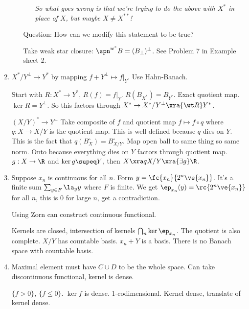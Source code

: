 \begin{enumerate}
\begin{enumerate}
\begin{enumerate}
{\it So what goes wrong is that we're trying to do the above with $X^*$ in place of $X$, but maybe $X\ne X^{**}$!}

\end{enumerate}
Question: How can we modify this statement to be true?

Take weak star closure: $\spn^{w^*} B=(B_{\perp})^{\perp}$. See Problem 7 in Example sheet 2.
\end{enumerate}

\item
$X^*/Y^{\perp}\to Y^*$ by mapping $f+Y^{\perp}\mapsto f|_Y$. Use Hahn-Banach.

Start with $R:X^*\to Y^*$, $R(f)=f|_Y$. $R(B_{X^*})=B_{Y^*}$. 
Exact quotient map.
$\ker R=Y^{\perp}$. So this factors through 
$X^*\to X^*/Y^{\perp}\xra{\wt R} Y^*$. 

$(X/Y)^*\to Y^{\perp}$ Take composite of $f$ and quotient map $f\mapsto f\circ q$ where $q:X\to X/Y$ is the quotient map. This is well defined because $q$ dies on $Y$. This is the fact that $q(B_X^{\circ})=B_{X/Y}^{\circ}$. Map open ball to same thing so same norm. Onto because everything dies on $Y$ factors through quotient map. $g:X\to \R$ and $\ker g\supeq Y$, then $X\xra q X/Y\xra{\exists g}\R$.
\item 
Suppose $x_n$ is continuous for all $n$. Form $y=\fc{x_n}{2^n\ve{x_n}}$. It's a finite sum $\sum_{y\in F}\la_yy$ where $F$ is finite. We get $\ep_{x_n}(y)=\rc{2^n\ve{x_n}}$ for all $n$, this is 0 for large $n$, get a contradiction.

Using Zorn can construct continuous functional.

Kernels are closed, intersection of kernels $\bigcap_n \ker \ep_{x_n}$. The quotient is also complete. $X/Y$ has countable basis. $x_n+Y$ is a basis. There is no Banach space with countable basis.
\item
Maximal element must have $C\cup D$ to be the whole space. Can take discontinuous functional, kernel is dense.

$\{f>0\}$, $\{f\le 0\}$. $\ker f$ is dense. 1-codimensional. Kernel dense, translate of kernel dense.


\end{enumerate}
